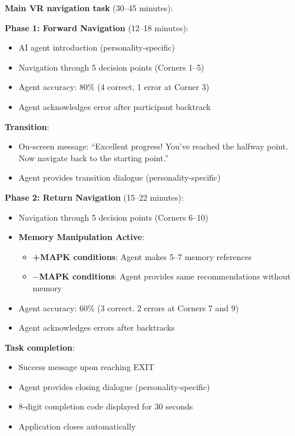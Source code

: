 \documentclass[12pt]{article}
\begin{document}
\textbf{Main VR navigation task} (30--45 minutes):

\textbf{Phase 1: Forward Navigation} (12--18 minutes):
\begin{itemize}
    \item AI agent introduction (personality-specific)
    \item Navigation through 5 decision points (Corners 1--5)
    \item Agent accuracy: 80\% (4 correct, 1 error at Corner 3)
    \item Agent acknowledges error after participant backtrack
\end{itemize}

\textbf{Transition}:
\begin{itemize}
    \item On-screen message: ``Excellent progress! You've reached the halfway point. Now navigate back to the starting point.''
    \item Agent provides transition dialogue (personality-specific)
\end{itemize}

\textbf{Phase 2: Return Navigation} (15--22 minutes):
\begin{itemize}
    \item Navigation through 5 decision points (Corners 6--10)
    \item \textbf{Memory Manipulation Active}:
    \begin{itemize}
        \item \textbf{+MAPK conditions}: Agent makes 5--7 memory references
        \item \textbf{$-$MAPK conditions}: Agent provides same recommendations without memory
    \end{itemize}
    \item Agent accuracy: 60\% (3 correct, 2 errors at Corners 7 and 9)
    \item Agent acknowledges errors after backtracks
\end{itemize}

\textbf{Task completion}:
\begin{itemize}
    \item Success message upon reaching EXIT
    \item Agent provides closing dialogue (personality-specific)
    \item 8-digit completion code displayed for 30 seconds
    \item Application closes automatically
\end{itemize}
\end{document}
